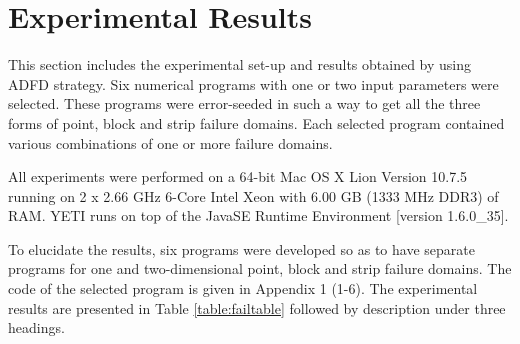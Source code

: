 \section{Experimental Results} \label{sec:experimentalResults}
This section includes the experimental set-up and results obtained by using ADFD strategy. Six numerical programs with one or two input parameters were selected. These programs were error-seeded in such a way to get all the three forms of point, block and strip failure domains. Each selected program contained various combinations of one or more failure domains. 

All experiments were performed on a 64-bit Mac OS X Lion Version 10.7.5 running on 2 x 2.66 GHz 6-Core Intel Xeon with 6.00 GB (1333 MHz DDR3) of RAM. YETI runs on top of the Java\texttrademark  SE Runtime Environment [version 1.6.0\_35]. 

To elucidate the results, six programs were developed so as to have separate programs for one and two-dimensional point, block and strip failure domains. The code of the selected program is given in Appendix 1 (1-6). The experimental results are presented in Table \ref{table:failtable} followed by description under three headings.

